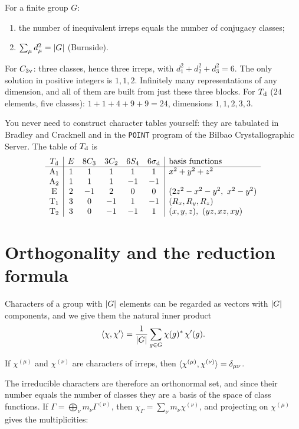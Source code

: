\begin{theorem}\label{thm:classcount}
For a finite group $G$:
\begin{enumerate}
\item the number of inequivalent irreps equals the number of conjugacy classes;
\item $\sum_\mu d_\mu^2=\lvert G\rvert$ (Burnside).
\end{enumerate}
\end{theorem}
For $C_{3\mathrm{v}}$: three classes, hence three irreps, with $d_1^2+d_2^2+d_3^2=6$. The only
solution in positive integers is $1,1,2$. Infinitely many representations of any
dimension, and all of them are built from just these three blocks. For $T_{\mathrm{d}}$
($24$ elements, five classes): $1+1+4+9+9=24$, dimensions $1,1,2,3,3$.

You never need to construct character tables yourself: they are tabulated in
Bradley and Cracknell and in the \texttt{POINT} program of the Bilbao
Crystallographic Server. The table of $T_{\mathrm{d}}$ is
\begin{equation}\label{eq:Tdchar}
\begin{array}{c|ccccc|l}
\Td & E & 8C_3 & 3C_2 & 6S_4 & 6\sd & \text{basis functions}\\\hline
\irr{A}_1 & 1 & 1 & 1 & 1 & 1 & x^2+y^2+z^2\\
\irr{A}_2 & 1 & 1 & 1 & -1 & -1 & \\
\irr{E} & 2 & -1 & 2 & 0 & 0 & (2z^2-x^2-y^2,\ x^2-y^2)\\
\irr{T}_1 & 3 & 0 & -1 & 1 & -1 & (R_x,R_y,R_z)\\
\irr{T}_2 & 3 & 0 & -1 & -1 & 1 & (x,y,z),\ (yz,xz,xy)
\end{array}
\end{equation}

\section{Orthogonality and the reduction formula}

Characters of a group with $\lvert G\rvert$ elements can be regarded as vectors with
$\lvert G\rvert$ components, and we give them the natural inner product
\begin{equation}\label{eq:inner}
  \langle \chi, \chi'\rangle=\frac{1}{\lvert G\rvert}\sum_{g\in G}\chi(g)^{*}\,\chi'(g).
\end{equation}

\begin{theorem}\label{thm:orth}
If $\chi^{(\mu)}$ and $\chi^{(\nu)}$ are characters of irreps, then
$\langle \chi^{(\mu)}, \chi^{(\nu)}\rangle=\delta_{\mu\nu}$.
\end{theorem}
The irreducible characters are therefore an orthonormal set, and since their number
equals the number of classes they are a basis of the space of class functions. If
$\Gamma=\bigoplus_\nu m_\nu\Gamma^{(\nu)}$, then $\chi_\Gamma=\sum_\nu m_\nu\chi^{(\nu)}$,
and projecting on $\chi^{(\mu)}$ gives the multiplicities:


